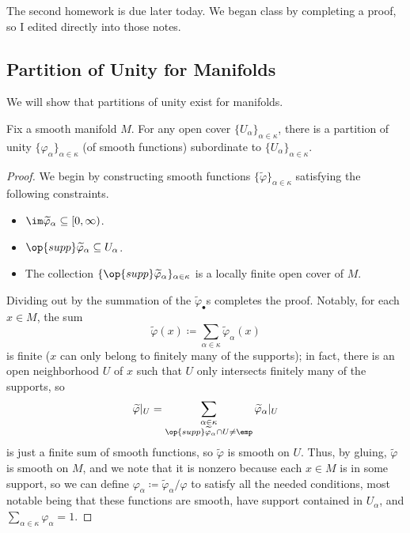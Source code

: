 \documentclass[../notes.tex]{subfiles}
\begin{document}
The second homework is due later today. We began class by completing a proof, so I edited directly into those notes.

\subsection{Partition of Unity for Manifolds}
We will show that partitions of unity exist for manifolds.
\begin{theorem} \label{thm:partition-of-unity}
	Fix a smooth manifold $M$. For any open cover $\{U_\alpha\}_{\alpha\in\kappa}$, there is a partition of unity $\{\varphi_\alpha\}_{\alpha\in\kappa}$ (of smooth functions) subordinate to $\{U_\alpha\}_{\alpha\in\kappa}$.
\end{theorem}
\begin{proof}
	We begin by constructing smooth functions $\{\widetilde\varphi\}_{\alpha\in\kappa}$ satisfying the following constraints.
	\begin{itemize}
		\item $\im\widetilde\varphi_\alpha\subseteq[0,\infty)$.
		\item $\op{supp}\widetilde\varphi_\alpha\subseteq U_\alpha$.
		\item The collection $\{\op{supp}\widetilde\varphi_\alpha\}_{\alpha\in\kappa}$ is a locally finite open cover of $M$.
	\end{itemize}
	Dividing out by the summation of the $\widetilde\varphi_\bullet$s completes the proof. Notably, for each $x\in M$, the sum
	\[\widetilde\varphi(x)\coloneqq\sum_{\alpha\in\kappa}\widetilde\varphi_\alpha(x)\]
	is finite ($x$ can only belong to finitely many of the supports); in fact, there is an open neighborhood $U$ of $x$ such that $U$ only intersects finitely many of the supports, so
	\[\widetilde\varphi|_U=\sum_{\substack{\alpha\in\kappa\\\op{supp}\widetilde\varphi_\alpha\cap U\ne\emp}}\widetilde\varphi_\alpha|_U\]
	is just a finite sum of smooth functions, so $\widetilde\varphi$ is smooth on $U$. Thus, by gluing, $\widetilde\varphi$ is smooth on $M$, and we note that it is nonzero because each $x\in M$ is in some support, so we can define $\varphi_\alpha\coloneqq\widetilde\varphi_\alpha/\varphi$ to satisfy all the needed conditions, most notable being that these functions are smooth, have support contained in $U_\alpha$, and $\sum_{\alpha\in\kappa}\varphi_\alpha=1$.


\end{proof}
\end{document}
